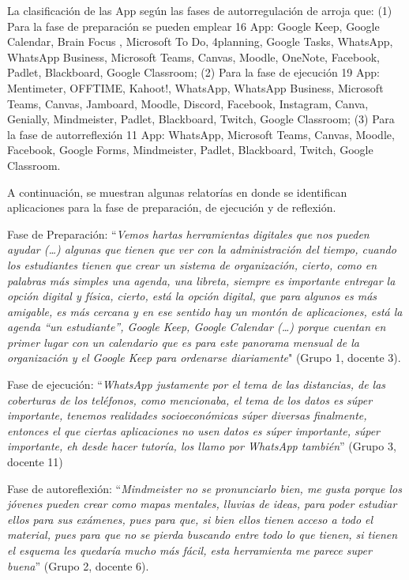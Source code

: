 \documentclass[spanish]{textolivre}
\begin{document}
La clasificación de las App según las fases de autorregulación de \textcite[p. 142]{zimmerman2013} arroja que: (1) Para la fase de preparación se pueden emplear 16 App: Google Keep, Google Calendar, Brain Focus , Microsoft To Do, 4planning, Google Tasks, WhatsApp, WhatsApp Business, Microsoft Teams, Canvas, Moodle, OneNote, Facebook, Padlet, Blackboard, Google Classroom; (2) Para la fase de ejecución 19 App: Mentimeter, OFFTIME, Kahoot!, WhatsApp, WhatsApp Business, Microsoft Teams, Canvas, Jamboard, Moodle, Discord, Facebook, Instagram, Canva, Genially, Mindmeister, Padlet, Blackboard, Twitch, Google Classroom; (3) Para la fase de autorreflexión 11 App: WhatsApp, Microsoft Teams, Canvas, Moodle, Facebook, Google Forms, Mindmeister, Padlet, Blackboard, Twitch, Google Classroom.

A continuación, se muestran algunas relatorías en donde se identifican aplicaciones para la fase de preparación, de ejecución y de reflexión.

Fase de Preparación: “\emph{Vemos hartas herramientas digitales que nos pueden ayudar (…) algunas que tienen que ver con la administración del tiempo, cuando los estudiantes tienen que crear un sistema de organización, cierto, como en palabras más simples una agenda, una libreta, siempre es importante entregar la opción digital y física, cierto, está la opción digital, que para algunos es más amigable, es más cercana y en ese sentido hay un montón de aplicaciones, está la agenda “un estudiante”, Google Keep, Google Calendar (…) porque cuentan en primer lugar con un calendario que es para este panorama mensual de la organización y el Google Keep para ordenarse diariamente}" (Grupo 1, docente 3).

Fase de ejecución: “\emph{WhatsApp justamente por el tema de las distancias, de las coberturas de los teléfonos, como mencionaba, el tema de los datos es súper importante, tenemos realidades socioeconómicas súper diversas finalmente, entonces el que ciertas aplicaciones no usen datos es súper importante, súper importante, eh desde hacer tutoría, los llamo por WhatsApp también}” (Grupo 3, docente 11)

Fase de autoreflexión: “\emph{Mindmeister no se pronunciarlo bien, me gusta porque los jóvenes pueden crear como mapas mentales, lluvias de ideas, para poder estudiar ellos para sus exámenes, pues para que, si bien ellos tienen acceso a todo el material, pues para que no se pierda buscando entre todo lo que tienen, si tienen el esquema les quedaría mucho más fácil, esta herramienta me parece super buena}” (Grupo 2, docente 6).
\end{document}
